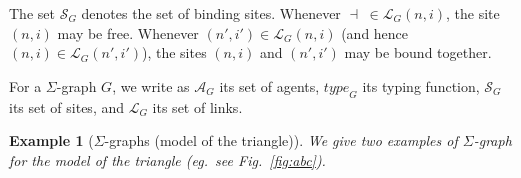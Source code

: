 \documentclass{entcs}
\newcommand{\freesymbol}{\dashv}
\newcommand{\boundsymbol}{-}
\renewcommand{\bound}[1]{\boundsymbol}
\newcommand{\graphsymb}{G}
\newcommand{\agents}[1][\graphsymb]{\mathcal{A}_{#1}}
\newcommand{\type}[1][\graphsymb]{\textit{type}_{#1}}
\newcommand{\sites}[1][\graphsymb]{\mathcal{S}_{#1}}
\newcommand{\links}[1][\graphsymb]{\mathcal{L}_{#1}}
\newtheorem{myexample}[thm]{Example}
\begin{document}
The set $\sites$ denotes the set of binding sites.
Whenever $\freesymbol\;\in\links(n,i)$, the site $(n,i)$ may be free.
Whenever $(n',i')\in\links(n,i)$ (and hence $(n,i)\in\links(n',i')$), the sites $(n,i)$ and $(n',i')$ may be bound together.

For a $\Sigma$-graph $\graphsymb$, we write as $\agents[\graphsymb]$ its set of agents, $\type[\graphsymb]$ its typing function, $\sites[\graphsymb]$ its set of sites, and $\links[\graphsymb]$ its set of links.


\begin{myexample}[$\Sigma$-graphs (model of the triangle)]
  \renewcommand{\graphsymb}{\mathcal{T}}
  We give two examples of $\Sigma$-graph for the model of the triangle
  (eg.~see Fig.~\ref{fig:abc}).


\end{myexample}
\end{document}
